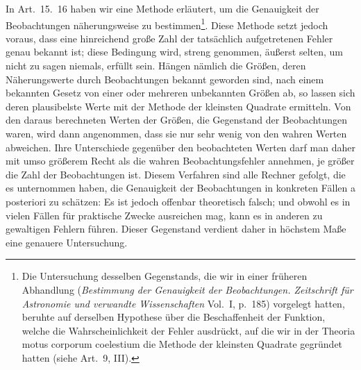 In Art.\ 15.\ 16 haben wir eine Methode erläutert, um die Genauigkeit der Beobachtungen näherungsweise zu bestimmen\footnote{Die Untersuchung desselben Gegenstands, die wir in einer früheren Abhandlung (\textit{Bestimmung der Genauigkeit der Beobachtungen. Zeitschrift für Astronomie und verwandte Wissenschaften} Vol.\ I, p.\ 185) vorgelegt hatten, beruhte auf derselben Hypothese über die Beschaffenheit der Funktion, welche die Wahrscheinlichkeit der Fehler ausdrückt, auf die wir in der Theoria motus corporum coelestium die Methode der kleinsten Quadrate gegründet hatten (siehe Art.\ 9, III).}. Diese Methode setzt jedoch voraus, dass eine hinreichend große Zahl der tatsächlich aufgetretenen Fehler genau bekannt ist; diese Bedingung wird, streng genommen, äußerst selten, um nicht zu sagen niemals, erfüllt sein. Hängen nämlich die Größen, deren Näherungswerte durch Beobachtungen bekannt geworden sind, nach einem bekannten Gesetz von einer oder mehreren unbekannten Größen ab, so lassen sich deren plausibelste Werte mit der Methode der kleinsten Quadrate ermitteln. Von den daraus berechneten Werten der Größen, die Gegenstand der Beobachtungen waren, wird dann angenommen, dass sie nur sehr wenig von den
%
wahren Werten abweichen. Ihre Unterschiede gegenüber den beobachteten Werten darf man daher mit umso größerem Recht als die wahren Beobachtungsfehler annehmen, je größer die Zahl der Beobachtungen ist. Diesem Verfahren sind alle Rechner gefolgt, die es unternommen haben, die Genauigkeit der Beobachtungen in konkreten Fällen a posteriori zu schätzen: Es ist jedoch offenbar theoretisch falsch; und obwohl es in vielen Fällen für praktische Zwecke ausreichen mag, kann es in anderen zu gewaltigen Fehlern führen. Dieser Gegenstand verdient daher in höchstem Maße eine genauere Untersuchung.

